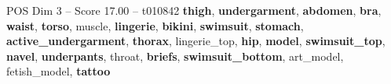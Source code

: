 \begin{textsample}{POS Dim 3 – Score 17.00 – t010842}  \label{ex:f3_pos_017}
\textbf{thigh}, \textbf{undergarment}, \textbf{abdomen}, \textbf{bra}, \textbf{waist}, \textbf{torso}, muscle, \textbf{lingerie}, \textbf{bikini}, \textbf{swimsuit}, \textbf{stomach}, \textbf{active\_undergarment}, \textbf{thorax}, lingerie\_top, \textbf{hip}, \textbf{model}, \textbf{swimsuit\_top}, \textbf{navel}, \textbf{underpants}, throat, \textbf{briefs}, \textbf{swimsuit\_bottom}, art\_model, fetish\_model, \textbf{tattoo}

\end{textsample}
